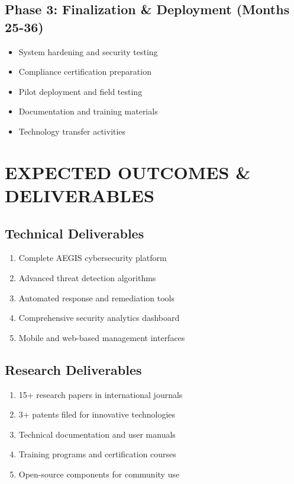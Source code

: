\documentclass[12pt,a4paper]{article}
\begin{document}
\subsection{Phase 3: Finalization \& Deployment (Months 25-36)}
\begin{itemize}
\item System hardening and security testing
\item Compliance certification preparation
\item Pilot deployment and field testing
\item Documentation and training materials
\item Technology transfer activities
\end{itemize}

\section{EXPECTED OUTCOMES \& DELIVERABLES}

\subsection{Technical Deliverables}
\begin{enumerate}
\item Complete AEGIS cybersecurity platform
\item Advanced threat detection algorithms
\item Automated response and remediation tools
\item Comprehensive security analytics dashboard
\item Mobile and web-based management interfaces
\end{enumerate}

\subsection{Research Deliverables}
\begin{enumerate}
\item 15+ research papers in international journals
\item 3+ patents filed for innovative technologies
\item Technical documentation and user manuals
\item Training programs and certification courses
\item Open-source components for community use
\end{enumerate}
\end{document}
